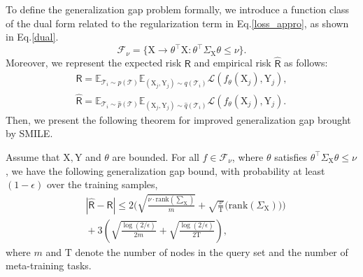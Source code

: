 To define the generalization gap problem formally, we introduce a function class of the dual form related to the regularization term in Eq.\ref{loss_appro}, as shown in Eq.\ref{dual}.
\begin{equation}
\label{dual}
\mathcal{F}_\nu\!=\!\{\mathrm{X}\rightarrow\theta^\top\mathrm{X}:\theta^\top\Sigma_\mathrm{X}\theta\leq\nu\}.
\end{equation}
Moreover, we represent the expected risk $\mathsf R$ and empirical risk $\hat{\mathsf R}$ as follows:
\begin{equation}
    \begin{aligned}
        \mathsf R\!=\!\mathbb E_{\mathcal{T}_i \sim p(\mathcal{T})}\mathbb E_{(\mathrm{X}_j,\mathrm{Y}_j)\sim q(\mathcal{T}_i)}\mathcal{L}(f_\theta(\mathrm{X}_j),\mathrm{Y}_j), \\
        \hat{\mathsf R}\!=\!\mathbb E_{\mathcal{T}_i\sim\hat{p}(\mathcal{T})}\mathbb E_{(\mathrm{X}_j,\mathrm{Y}_j)\sim\hat{q}(\mathcal{T}_i)}\mathcal{L}(f_\theta(\mathrm{X}_j),\mathrm{Y}_j).
    \end{aligned}
\end{equation}
Then, we present the following theorem for improved generalization gap brought by SMILE.
\begin{theorem}
\label{theorem_1}
  Assume that $\mathrm{X}, \mathrm{Y}$ and $\theta$ are bounded. For all $f\!\in\! \mathcal{F}_\nu$, where $\theta$ satisfies $\theta^\top\Sigma_\mathrm{X}\theta\!\leq\! \nu$, we have the following generalization gap bound, with probability at least $(1-\epsilon)$ over the training samples,
  \begin{equation}
  \begin{split}
    &|\hat{\mathsf{R}}-\mathsf{R}|\leq 2\Bigg(\sqrt{\frac{\nu\cdot\textrm{rank}(\sum_\mathrm{X})}{m}} \!+\! \sqrt{\frac{\nu}{\mathrm{T}}}\bigg( \textrm{rank}(\Sigma_\mathrm{X}) \bigg) \Bigg) \\ 
    &\!+\!  3\left(\sqrt{\frac{\log(2/\epsilon)}{2m}}\!+\!\sqrt{\frac{\log(2/\epsilon)}{2\mathrm{T}}}\right),
  \end{split}
  \end{equation}
  where $m$ and $\mathrm{T}$ denote the number of nodes in the query set and the number of meta-training tasks.
\end{theorem}

